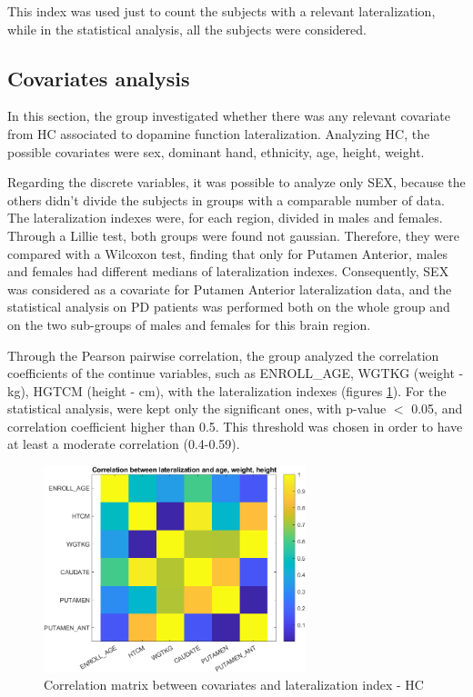 \documentclass[]{article}
\begin{document}
\begin{multicols}{2}
This index was used just to count the subjects with a relevant lateralization, while in the statistical analysis, all the subjects were considered.

\subsection{Covariates analysis}

In this section, the group investigated whether there was any relevant covariate from HC associated to dopamine function lateralization.
Analyzing HC, the possible covariates were sex, dominant hand, ethnicity, age, height, weight.

Regarding the discrete variables, it was possible to analyze only SEX, because the others didn't divide the subjects in groups with a comparable number of data. 
The lateralization indexes were, for each region, divided in males and females. Through a Lillie test, both groups were found not gaussian. Therefore, they were compared with a Wilcoxon test, finding that only for Putamen Anterior, males and females had different medians of lateralization indexes.
Consequently, SEX was considered as a covariate for Putamen Anterior lateralization data, and the statistical analysis on PD patients was performed both on the whole group and on the two sub-groups of males and females for this brain region.

Through the Pearson pairwise correlation, the group analyzed the correlation coefficients of the continue variables, such as ENROLL\_AGE, WGTKG (weight - kg), HGTCM (height - cm), with the lateralization indexes (figures \ref{fig:cov_mat_hc}). For the statistical analysis, were kept only the significant ones, with p-value $<$ 0.05, and correlation coefficient higher than 0.5. This threshold was chosen in order to have at least a moderate correlation (0.4-0.59). 

\end{multicols}

\begin{figure}[h]
	\centering
	\includegraphics[width=3in]{../covariates_mat_hc}
	\caption{Correlation matrix between covariates and lateralization index - HC}
	\label{fig:cov_mat_hc}
\end{figure} 
 
\end{document}
